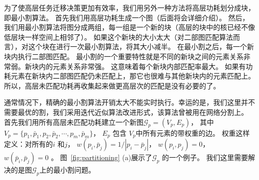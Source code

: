 为了使高层任务迁移决策更加有效率，我们用另外一种方法将高层功耗划分成块，即最小割算法。
首先我们用高层功耗生成一个图（后面将会详细介绍）。
然后，我们用最小割算法将图分成两组，每一组是一个新的块（高层的块中的核已经不像低层块一样空间上相邻了）。
如果这个新块的大小太大（对二部图匹配算法而言），对这个块在进行一次最小割算法，将其大小减半。
在最小割之后，每一个新块内执行二部图匹配。
最小割的一个重要特性就是不同的新块之间的元素关系非常弱。新块内的元素关系非常强。
这意味着每个新块内部匹配率最大。
如果有功耗元素在新块内二部图匹配仍未匹配上，那它也很难与其他新块内的元素匹配上。
所以，高层未匹配功耗再收集起来做更高层次的匹配是没有必要的了。

通常情况下，精确的最小割算法开销太大不能实时执行。幸运的是，我们这里并不需要最优的割，我们采用迭代近似算法改进形式，该算法曾被用在网络分割上。
首先我们用所有高层未匹配功耗建立一个新图$\mathcal{G}_p = (V_p, E_p)$，
其中 $V_p=\{p_1, \bar{p}_1, p_2, \bar{p}_2, \cdots, p_m, \bar{p}_m\}$， 
$E_p$ 包含 $V_p$中所有元素的带权重的边。
权重这样定义：对所有的$i$ 和$j$， $w(p_i, \bar{p}_j) = 1/|p_i-\bar{p}_j|$，
$w(p_i, p_j) = 0$， $w(\bar{p}_i, \bar{p}_j) = 0$  。
图~\ref{fig:partitioning} (a)展示了$\mathcal{G}_p$ 的一个例子。 
我们这里需要解决的是图$\mathcal{G}_p$上的最小割问题。 

